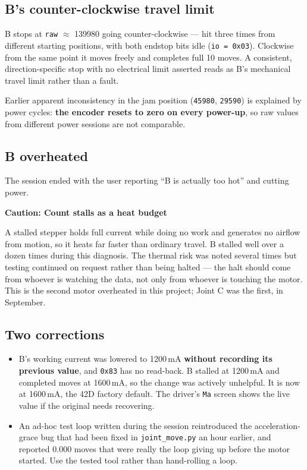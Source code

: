 \documentclass[11pt,letterpaper]{article}
\newenvironment{caution}[1]{%
    \par\addvspace{8pt}%
    \noindent{\color{cautionred}\rule{\linewidth}{0.8pt}}\par\vspace{2pt}
    \noindent\textbf{\color{cautionred}Caution: #1}\par\vspace{2pt}
}{%
    \par\vspace{2pt}\noindent{\color{cautionred}\rule{\linewidth}{0.4pt}}%
    \par\addvspace{8pt}%
}
\begin{document}
\subsection{B's counter-clockwise travel limit}
B stops at \texttt{raw} $\approx$ 139980 going counter-clockwise --- hit three
times from different starting positions, with both endstop bits idle
(\texttt{io = 0x03}). Clockwise from the same point it moves freely and
completes full 10\textdegree{} moves. A consistent, direction-specific stop with
no electrical limit asserted reads as B's mechanical travel limit rather than a
fault.

Earlier apparent inconsistency in the jam position (\texttt{45980},
\texttt{29590}) is explained by power cycles: \textbf{the encoder resets to zero
on every power-up}, so raw values from different power sessions are not
comparable.

\subsection{B overheated}
The session ended with the user reporting ``B is actually too hot'' and cutting
power.

\begin{caution}{Count stalls as a heat budget}
A stalled stepper holds full current while doing no work and generates no
airflow from motion, so it heats far faster than ordinary travel. B stalled well
over a dozen times during this diagnosis. The thermal risk was noted several
times but testing continued on request rather than being halted --- the halt
should come from whoever is watching the data, not only from whoever is touching
the motor. This is the second motor overheated in this project; Joint C was the
first, in September.
\end{caution}

\subsection{Two corrections}
\begin{itemize}
    \item B's working current was lowered to 1200\,mA \textbf{without recording
    its previous value}, and \texttt{0x83} has no read-back. B stalled at
    1200\,mA and completed moves at 1600\,mA, so the change was actively
    unhelpful. It is now at 1600\,mA, the 42D factory default. The driver's
    \texttt{Ma} screen shows the live value if the original needs recovering.
    \item An ad-hoc test loop written during the session reintroduced the
    acceleration-grace bug that had been fixed in \texttt{joint\_move.py} an
    hour earlier, and reported 0.000\textdegree{} moves that were really the
    loop giving up before the motor started. Use the tested tool rather than
    hand-rolling a loop.
\end{itemize}
\end{document}
